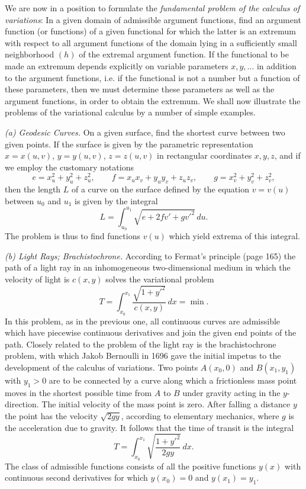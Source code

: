 We are now in a position to formulate the \emph{fundamental problem of the calculus of variations}: In a given domain of admissible argument functions, find an argument function (or functions) of a given functional for which the latter is an extremum with respect to all argument functions of the domain lying in a sufficiently small neighborhood $(h)$ of the extremal argument function. If the functional to be made an extremum depends explicitly on variable parameters $x,y,\ldots$ in addition to the argument functions, i.e. if the functional is not a number but a function of these parameters, then we must determine these parameters as well as the argument functions, in order to obtain the extremum. We shall now illustrate the problems of the variational calculus by a number of simple examples.

\emph{(a) Geodesic Curves.} On a given surface, find the shortest curve between two given points. If the surface is given by the parametric representation $x=x(u,v)$, $y=y(u,v)$, $z=z(u,v)$ in rectangular coordinates $x,y,z$, and if we employ the customary notations
\[
e=x_u^2+y_u^2+z_u^2,\qquad
f=x_ux_v+y_uy_v+z_uz_v,\qquad
g=x_v^2+y_v^2+z_v^2,
\]
then the length $L$ of a curve on the surface defined by the equation $v=v(u)$ between $u_0$ and $u_1$ is given by the integral
\[
L=\int_{u_0}^{u_1}\sqrt{e+2fv'+gv'^2}\,du.
\]
The problem is thus to find functions $v(u)$ which yield extrema of this integral.

\emph{(b) Light Rays; Brachistochrone.} According to Fermat's principle (page 165) the path of a light ray in an inhomogeneous two-dimensional medium in which the velocity of light is $c(x,y)$ solves the variational problem
\[
T=\int_{x_0}^{x_1}\frac{\sqrt{1+y'^2}}{c(x,y)}\,dx=\min.
\]
In this problem, as in the previous one, all continuous curves are admissible which have piecewise continuous derivatives and join the given end points of the path. Closely related to the problem of the light ray is the brachistochrone problem, with which Jakob Bernoulli in 1696 gave the initial impetus to the development of the calculus of variations. Two points $A(x_0,0)$ and $B(x_1,y_1)$ with $y_1>0$ are to be connected by a curve along which a frictionless mass point moves in the shortest possible time from $A$ to $B$ under gravity acting in the $y$-direction. The initial velocity of the mass point is zero. After falling a distance $y$ the point has the velocity $\sqrt{2gy}$, according to elementary mechanics, where $g$ is the acceleration due to gravity. It follows that the time of transit is the integral
\begin{equation}\tag{2}
T=\int_{x_0}^{x_1}\sqrt{\frac{1+y'^2}{2gy}}\,dx.
\end{equation}
The class of admissible functions consists of all the positive functions $y(x)$ with continuous second derivatives for which $y(x_0)=0$ and $y(x_1)=y_1$.

